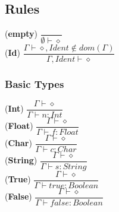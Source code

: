 \documentclass[12pt]{article}
\begin{document}
\subsection*{Rules}
\begin{center}
\noindent (\textbf{empty})
$\dfrac{}{\emptyset \vdash \diamond}$\\[0.2in]
\noindent (\textbf{Id})
$\dfrac{\Gamma \vdash \diamond , Ident \not\in dom(\Gamma)}{\Gamma , Ident \vdash \diamond}$\\[0.1in]
\end{center}

\subsubsection*{Basic Types}
\begin{center}
\noindent(\textbf{Int})
$\dfrac{\Gamma \vdash \diamond}{\Gamma \vdash n : Int}$\\[0.1in]
\noindent(\textbf{Float})
$\dfrac{\Gamma \vdash \diamond}{\Gamma \vdash f : Float}$\\[0.1in]
\noindent(\textbf{Char})
$\dfrac{\Gamma \vdash \diamond}{\Gamma \vdash c : Char}$\\[0.1in]
\noindent(\textbf{String})
$\dfrac{\Gamma \vdash \diamond}{\Gamma \vdash s : String}$\\[0.1in]
\noindent(\textbf{True})
$\dfrac{\Gamma \vdash \diamond}{\Gamma \vdash true : Boolean}$\\[0.1in]
\noindent(\textbf{False})
$\dfrac{\Gamma \vdash \diamond}{\Gamma \vdash false : Boolean}$\\[0.1in]
\end{center}
\end{document}
